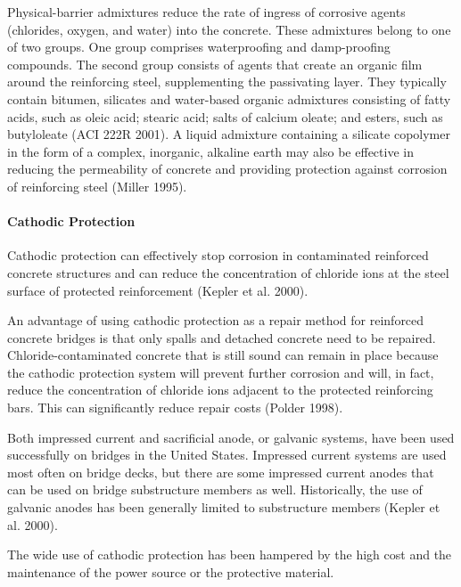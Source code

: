 Physical-barrier admixtures reduce the rate of ingress of corrosive agents (chlorides, oxygen, and water) into the concrete. These admixtures belong to one of two groups. One group comprises waterproofing and damp-proofing compounds. The second group consists of agents that create an organic film around the reinforcing steel, supplementing the passivating layer. They typically contain bitumen, silicates and water-based organic admixtures consisting of fatty acids, such as oleic acid; stearic acid; salts of calcium oleate; and esters, such as butyloleate (ACI 222R 2001). A liquid admixture containing a silicate copolymer in the form of a complex, inorganic, alkaline earth may also be effective in reducing the permeability of concrete and providing protection against corrosion of reinforcing steel (Miller 1995).



\paragraph{Cathodic Protection}
Cathodic protection can effectively stop corrosion in contaminated reinforced concrete structures and can reduce the concentration of chloride ions at the steel surface of protected reinforcement (Kepler et al. 2000).

An advantage of using cathodic protection as a repair method for reinforced concrete bridges is that only spalls and detached concrete need to be repaired. Chloride-contaminated concrete that is still sound can remain in place because the cathodic protection system will prevent further corrosion and will, in fact, reduce the concentration of chloride ions adjacent to the protected reinforcing bars. This can significantly reduce repair costs (Polder 1998).

Both impressed current and sacrificial anode, or galvanic systems, have been used successfully on bridges in the United States. Impressed current systems are used most often on bridge decks, but there are some impressed current anodes that can be used on bridge substructure members as well. Historically, the use of galvanic anodes has been generally limited to substructure members (Kepler et al. 2000).

The wide use of cathodic protection has been hampered by the high cost and the maintenance of the power source or the protective material.

